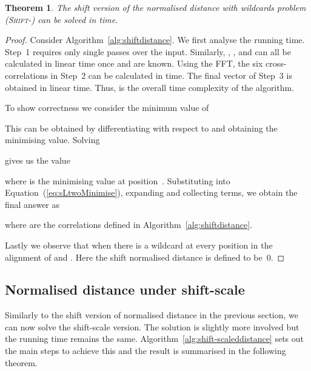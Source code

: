 \documentclass[11pt]{article}
\newcommand{\sLtwoWild}{\textsc{Shift-}\xspace}
\theoremstyle{plain}
\newtheorem{theorem}{Theorem}[]
\theoremstyle{definition}
\begin{document}
\begin{theorem}
    \label{thm:sLtwoWild}
    The shift version of the normalised  distance with wildcards problem (\sLtwoWild) can be solved in  time.\end{theorem}
\begin{proof}
    Consider Algorithm~\ref{alg:shiftdistance}. We first analyse the running time. Step~1 requires only single passes over the input. Similarly, , ,  and  can all be calculated in linear time once  and  are known. Using the FFT, the six cross-correlations in Step~2 can be calculated in  time. The final vector of Step~3 is obtained in linear time. Thus,  is the overall time complexity of the algorithm.

    To show correctness we consider the minimum value of

This can be obtained by differentiating with respect to  and obtaining the minimising value. Solving

gives us the value

where  is the minimising value at position~. Substituting  into Equation~(\ref{eq:sLtwoMinimise}), expanding and collecting terms, we obtain the final answer as

where  are the correlations defined in Algorithm~\ref{alg:shiftdistance}.

    Lastly we observe that when  there is a wildcard at every position in the alignment of  and . Here the shift normalised  distance is defined to be~0.
\end{proof}


\subsection{Normalised  distance under shift-scale}

Similarly to the shift version of normalised  distance in the previous section, we can now solve the shift-scale version. The solution is slightly more involved but the running time remains the same. Algorithm~\ref{alg:shift-scaleddistance} sets out the main steps to achieve this and the result is summarised in the following theorem.
\end{document}

